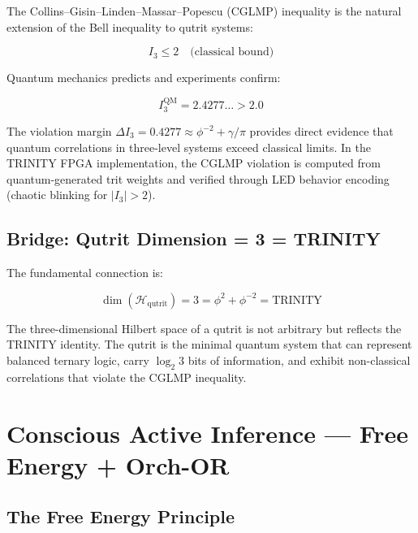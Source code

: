 \documentclass[12pt,a4paper]{article}
\begin{document}
The Collins--Gisin--Linden--Massar--Popescu (CGLMP) inequality is the natural
extension of the Bell inequality to qutrit systems:

\begin{equation}
I_3 \leq 2 \quad \text{(classical bound)}
\end{equation}

\noindent
Quantum mechanics predicts and experiments confirm:

\begin{equation}
I_3^{\mathrm{QM}} = 2.4277\ldots > 2.0
\label{eq:cglmp}
\end{equation}

\noindent
The violation margin $\Delta I_3 = 0.4277 \approx \phi^{-2} + \gamma/\pi$
provides direct evidence that quantum correlations in three-level systems
exceed classical limits. In the TRINITY FPGA implementation, the CGLMP
violation is computed from quantum-generated trit weights and verified
through LED behavior encoding (chaotic blinking for $|I_3| > 2$).

\subsection{Bridge: Qutrit Dimension = 3 = TRINITY}

The fundamental connection is:

\begin{equation}
\dim(\mathcal{H}_{\mathrm{qutrit}}) = 3 = \phi^2 + \phi^{-2} = \text{TRINITY}
\end{equation}

\noindent
The three-dimensional Hilbert space of a qutrit is not arbitrary but reflects
the TRINITY identity. The qutrit is the minimal quantum system that can
represent balanced ternary logic, carry $\log_2 3$ bits of information, and
exhibit non-classical correlations that violate the CGLMP inequality.

\section{Conscious Active Inference --- Free Energy + Orch-OR}
\label{sec:active_inference}

\subsection{The Free Energy Principle}
\end{document}
